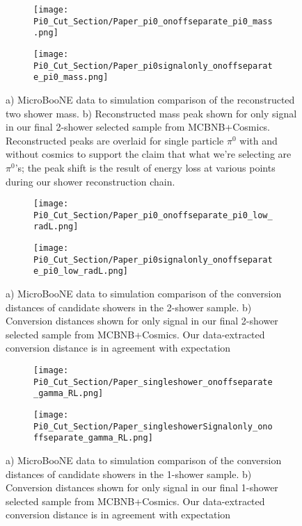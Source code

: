 \documentclass{article}
\begin{document}
\begin{figure}[h!]
\centering
\begin{subfigure}[b]{0.3\textwidth}
\texttt{[image: Pi0\_Cut\_Section/Paper\_pi0\_onoffseparate\_pi0\_mass.png]}
\caption{ }
\end{subfigure}
\hspace{20mm}
\begin{subfigure}[b]{0.3\textwidth}
\texttt{[image: Pi0\_Cut\_Section/Paper\_pi0signalonly\_onoffseparate\_pi0\_mass.png]}
\caption{ }
\end{subfigure}
\caption{a) MicroBooNE data to simulation comparison of the reconstructed two shower mass. b) Reconstructed mass peak shown for only signal in our final 2-shower selected sample from MCBNB+Cosmics. Reconstructed peaks are overlaid for single particle $\pi^0$ with and without cosmics to support the claim that what we're selecting are $\pi^0$'s; the peak shift is the result of energy loss at various points during our shower reconstruction chain. }
\label{fig:misc_twoshower_mass}
\end{figure}

\begin{figure}[h!]
\centering
\begin{subfigure}[b]{0.3\textwidth}
\texttt{[image: Pi0\_Cut\_Section/Paper\_pi0\_onoffseparate\_pi0\_low\_radL.png]}
\caption{ }
\end{subfigure}
\hspace{20mm}
\begin{subfigure}[b]{0.3\textwidth}
\texttt{[image: Pi0\_Cut\_Section/Paper\_pi0signalonly\_onoffseparate\_pi0\_low\_radL.png]}
\caption{ }
\end{subfigure}
\caption{a) MicroBooNE data to simulation comparison of the conversion distances of candidate showers in the 2-shower sample. b) Conversion distances shown for only signal in our final 2-shower selected sample from MCBNB+Cosmics. Our data-extracted conversion distance is in agreement with expectation }
\label{fig:misc_twoshower_conversion distance}
\end{figure}

\begin{figure}[h!]
\centering
\begin{subfigure}[b]{0.3\textwidth}
\texttt{[image: Pi0\_Cut\_Section/Paper\_singleshower\_onoffseparate\_gamma\_RL.png]}
\caption{ }
\end{subfigure}
\hspace{20mm}
\begin{subfigure}[b]{0.3\textwidth}
\texttt{[image: Pi0\_Cut\_Section/Paper\_singleshowerSignalonly\_onoffseparate\_gamma\_RL.png]}
\caption{ }
\end{subfigure}
\caption{a) MicroBooNE data to simulation comparison of the conversion distances of candidate showers in the 1-shower sample. b) Conversion distances shown for only signal in our final 1-shower selected sample from MCBNB+Cosmics. Our data-extracted conversion distance is in agreement with expectation }
\label{fig:misc_twoshower_conversion distance}
\end{figure}
\end{document}
